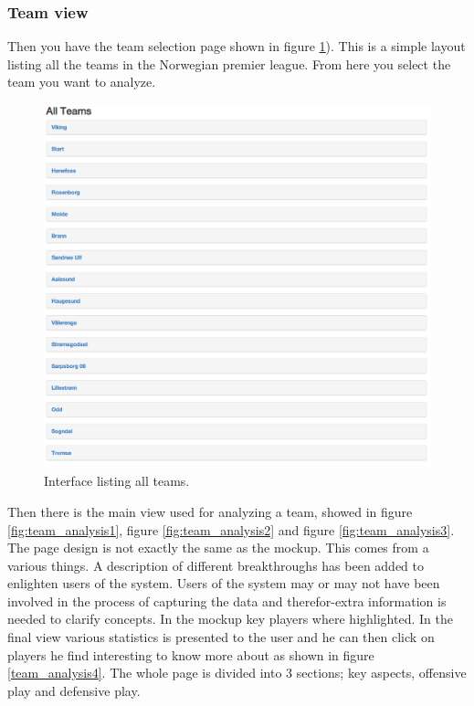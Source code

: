 \subsubsection{Team view}

Then you have the team selection page shown in figure \ref{fig:all_teams}). This is a simple layout listing all the teams in the Norwegian premier league. From here you select the team you want to analyze.

\begin{figure}[ht!]
\centering
\includegraphics[width=1\textwidth]{images/general/all_teams.png}
\caption{Interface listing all teams.}
\label{fig:all_teams}
\end{figure}

Then there is the main view used for analyzing a team, showed in figure \ref{fig:team_analysis1}, figure \ref{fig:team_analysis2} and figure \ref{fig:team_analysis3}. The page design is not exactly the same as the mockup. This comes from a various things. A description of different breakthroughs has been added to enlighten users of the system. Users of the system may or may not have been involved in the process of capturing the data and therefor-extra information is needed to clarify concepts. In the mockup key players where highlighted. In the final view various statistics is presented to the user and he can then click on players he find interesting to know more about as shown in figure \ref{team_analysis4}. The whole page is divided into 3 sections; key aspects, offensive play and defensive play.

